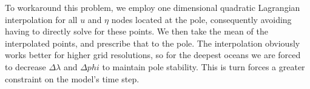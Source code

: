 To workaround this problem, we employ one dimensional quadratic Lagrangian interpolation for all $u$ and $\eta$ nodes located at the pole, consequently avoiding having to directly solve for these points. We then take the mean of the interpolated points, and prescribe that to the pole. The interpolation obviously works better for higher grid resolutions, so for the deepest oceans we are forced to decrease $\Delta \lambda$ and $\Delta phi$ to maintain pole stability. This is turn forces a greater constraint on the model's time step.


